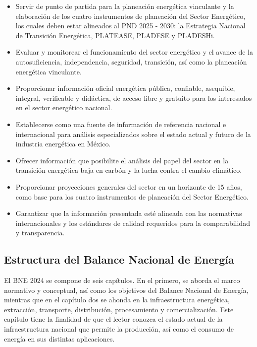 \documentclass{sener2025}
\begin{document}
\begin{itemize}
  \item Servir de punto de partida para la planeación energética vinculante y la elaboración de los cuatro instrumentos de planeación del Sector Energético, los cuales deben estar alineados al PND 2025 - 2030: la Estrategia Nacional de Transición Energética, PLATEASE, PLADESE y PLADESHi.
  \item Evaluar y monitorear el funcionamiento del sector energético y el avance de la autosuficiencia, independencia, seguridad, transición, así como la planeación energética vinculante.
  \item Proporcionar información oficial energética pública, confiable, asequible, integral, verificable y didáctica, de acceso libre y gratuito para los interesados en el sector energético nacional.
  \item Establecerse como una fuente de información de referencia nacional e internacional para análisis especializados sobre el estado actual y futuro de la industria energética en México.
  \item Ofrecer información que posibilite el análisis del papel del sector en la transición energética baja en carbón y la lucha contra el cambio climático.
  \item Proporcionar proyecciones generales del sector en un horizonte de 15 años, como base para los cuatro instrumentos de planeación del Sector Energético.
  \item Garantizar que la información presentada esté alineada con las normativas internacionales y los estándares de calidad requeridos para la comparabilidad y transparencia.
\end{itemize}


\subsection{ Estructura del Balance Nacional de Energía}

El BNE 2024 se compone de seis capítulos. En el primero, se aborda el marco normativo y conceptual, así como los objetivos del Balance Nacional de Energía, mientras que en el capítulo dos se ahonda en la infraestructura energética, extracción, transporte, distribución, procesamiento y comercialización. Este capítulo tiene la finalidad de que el lector conozca el estado actual de la infraestructura nacional que permite la producción, así como el consumo de energía en sus distintas aplicaciones.
\end{document}
